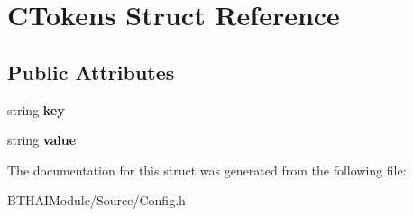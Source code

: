 \hypertarget{struct_c_tokens}{\section{C\-Tokens Struct Reference}
\label{struct_c_tokens}
}
\subsection*{Public Attributes}
\begin{DoxyCompactItemize}
\item 
\hypertarget{struct_c_tokens_aab620a64d4e57fe268c0a09a92cd119a}{string {\bfseries key}}\label{struct_c_tokens_aab620a64d4e57fe268c0a09a92cd119a}

\item 
\hypertarget{struct_c_tokens_a159c03f8d6cdd2343884c0b6c8b3788e}{string {\bfseries value}}\label{struct_c_tokens_a159c03f8d6cdd2343884c0b6c8b3788e}

\end{DoxyCompactItemize}


The documentation for this struct was generated from the following file\-:\begin{DoxyCompactItemize}
\item 
B\-T\-H\-A\-I\-Module/\-Source/Config.\-h\end{DoxyCompactItemize}
